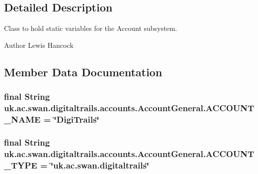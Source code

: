 \subsection{Detailed Description}
Class to hold static variables for the Account subsystem. 

\begin{DoxyAuthor}{Author}
Lewis Hancock 
\end{DoxyAuthor}


\subsection{Member Data Documentation}
\hypertarget{classuk_1_1ac_1_1swan_1_1digitaltrails_1_1accounts_1_1_account_general_a4a73125c4d02277098caa3048e956830}{
\subsubsection[{A\+C\+C\+O\+U\+N\+T\+\_\+\+N\+A\+M\+E}]{\setlength{\rightskip}{0pt plus 5cm}final String uk.\+ac.\+swan.\+digitaltrails.\+accounts.\+Account\+General.\+A\+C\+C\+O\+U\+N\+T\+\_\+\+N\+A\+M\+E = \char`\"{}Digi\+Trails\char`\"{}\hspace{0.3cm}{\ttfamily [static]}}}\label{classuk_1_1ac_1_1swan_1_1digitaltrails_1_1accounts_1_1_account_general_a4a73125c4d02277098caa3048e956830}
\hypertarget{classuk_1_1ac_1_1swan_1_1digitaltrails_1_1accounts_1_1_account_general_ad61076ae0093d3190a34939cae8aba50}{
\subsubsection[{A\+C\+C\+O\+U\+N\+T\+\_\+\+T\+Y\+P\+E}]{\setlength{\rightskip}{0pt plus 5cm}final String uk.\+ac.\+swan.\+digitaltrails.\+accounts.\+Account\+General.\+A\+C\+C\+O\+U\+N\+T\+\_\+\+T\+Y\+P\+E = \char`\"{}uk.\+ac.\+swan.\+digitaltrails\char`\"{}\hspace{0.3cm}{\ttfamily [static]}}}\label{classuk_1_1ac_1_1swan_1_1digitaltrails_1_1accounts_1_1_account_general_ad61076ae0093d3190a34939cae8aba50}

